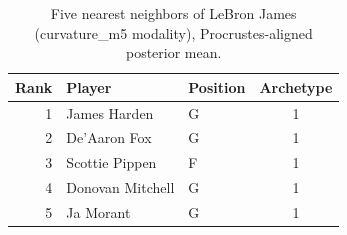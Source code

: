 \begin{table}[htbp]
  \centering\small
  \begin{tabular}{rllc}
    \toprule
    Rank & Player & Position & Archetype \\
    \midrule
    1 & James Harden & G & 1 \\
    2 & De'Aaron Fox & G & 1 \\
    3 & Scottie Pippen & F & 1 \\
    4 & Donovan Mitchell & G & 1 \\
    5 & Ja Morant & G & 1 \\
    \bottomrule
  \end{tabular}
  \caption{Five nearest neighbors of LeBron James (curvature_m5 modality), Procrustes-aligned posterior mean.}
  \label{tab:LeBron_James_neighbors_curvature_m5}
\end{table}

